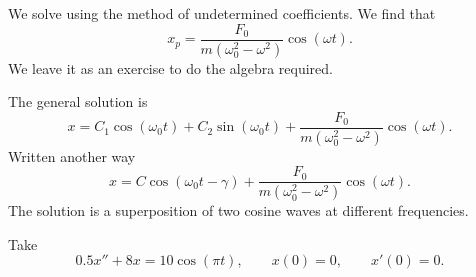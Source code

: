 \documentclass{ximera}
\begin{document}
We solve using the method of undetermined coefficients.  We find that
\begin{equation*}
    x_p = \frac{F_0}{m(\omega_0^2 - \omega^2)} \cos (\omega t) .
\end{equation*}
We leave it as an exercise to do the algebra required.

The general solution is
\begin{equation*}
    x = C_1 \cos (\omega_0 t) + C_2 \sin (\omega_0 t) +
    \frac{F_0}{m(\omega_0^2 - \omega^2)} \cos (\omega t) .
\end{equation*}
Written another way
\begin{equation*}
    x = C \cos (\omega_0 t - \gamma) + \frac{F_0}{m(\omega_0^2 - \omega^2)} \cos (\omega t) .
\end{equation*}
The solution is a superposition of two cosine waves at different frequencies.


\begin{example}
    Take
    \begin{equation*}
        0.5 x'' + 8 x = 10 \cos (\pi t), \qquad x(0)=0, \qquad x'(0)=0 .
    \end{equation*}
\end{example}
\end{document}
